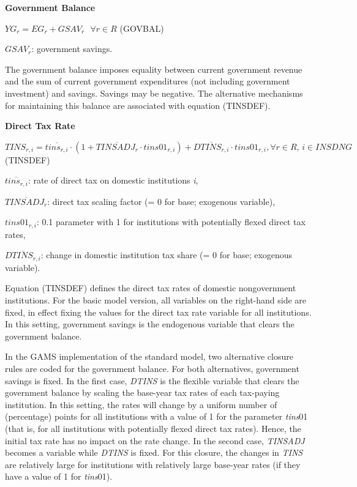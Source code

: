 \documentclass[10pt,a4paper,titlepage,dvipdfmx]{book}
\begin{document}
\begin{flushleft}\textbf{Government Balance}\end{flushleft}


\begin{center}$YG_{r}=EG_{r}+GSAV_{r}\,\,\,\,\forall r\in R$ (GOVBAL)
\end{center}

\begin{flushleft} $GSAV_{r}$: government savings. \end{flushleft}

The government balance imposes equality between current government revenue and the sum of current government expenditures (not including government investment) and savings. Savings may be negative. The alternative mechanisms for maintaining this balance are associated with equation (TINSDEF).

\begin{flushleft}\textbf{Direct Tax Rate}\end{flushleft}


\begin{center}$TINS_{r,i}=\overline{tins_{r,i}}\cdot \left(1+\overline{TINSADJ_{r}}\cdot tins01_{r,i}\right)+\overline{DTINS_{r,i}}\cdot tins01_{r,i},\forall r\in R,\,i\in INSDNG$ (TINSDEF)
\end{center}

\begin{flushleft}
$\overline{tins_{r,i}}$: rate of direct tax on domestic institutions \textit{i},

$\overline{TINSADJ_{r}}$: direct tax scaling factor (= 0 for base; exogenous variable),

$tins01_{r,i}$: 0.1 parameter with 1 for institutions with potentially flexed direct tax rates,

$\overline{DTINS_{r,i}}$: change in domestic institution tax share (= 0 for base; exogenous variable).
\end{flushleft}

Equation (TINSDEF) defines the direct tax rates of domestic nongovernment institutions. For the basic model version, all variables on the right-hand side are fixed, in effect fixing the values for the direct tax rate variable for all institutions. In this setting, government savings is the endogenous variable that clears the government balance.

In the GAMS implementation of the standard model, two alternative closure rules are coded for the government balance. For both alternatives, government savings is fixed. In the first case, \textit{DTINS} is the flexible variable that clears the government balance by scaling the base-year tax rates of each tax-paying institution. In this setting, the rates will change by a uniform number of (percentage) points for all institutions with a value of 1 for the parameter \textit{tins}01 (that is, for all institutions with potentially flexed direct tax rates). Hence, the initial tax rate has no impact on the rate change. In the second case, \textit{TINSADJ} becomes a variable while \textit{DTINS} is fixed. For this closure, the changes in \textit{TINS} are relatively large for institutions with relatively large base-year rates (if they have a value of 1 for \textit{tins}01).
\end{document}

